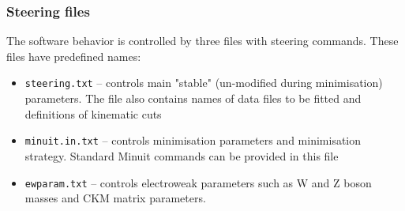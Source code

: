 \subsubsection{Steering files}
 The software behavior is controlled by three files with steering commands.
 These files have predefined names:
    
\begin{itemize}
      \item {\tt steering.txt}  --   controls main "stable" (un-modified during 
                         minimisation) parameters. The file also contains
                         names of data files to be fitted and definitions 
                         of kinematic cuts                              
      \item {\tt minuit.in.txt}
                   --  controls minimisation parameters and minimisation 
                         strategy. Standard Minuit commands can be provided
                         in this file
      \item {\tt ewparam.txt}    --  controls electroweak parameters such
        as W and Z boson masses and CKM matrix parameters.
\end{itemize}



